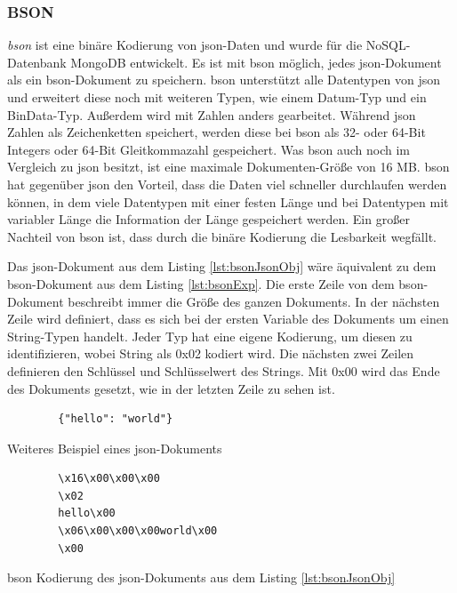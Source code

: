 \subsubsection{BSON}
\textit{\ac{bson}} ist eine binäre Kodierung von \ac{json}-Daten und wurde für die NoSQL-Datenbank MongoDB entwickelt.\cite{geeksforgeeksWhatBSON} Es ist mit \ac{bson} möglich, jedes \ac{json}-Dokument als ein \ac{bson}-Dokument zu speichern. \ac{bson} unterstützt alle Datentypen von \ac{json} und erweitert diese noch mit weiteren Typen, wie einem Datum-Typ und ein BinData-Typ. Außerdem wird mit Zahlen anders gearbeitet. Während \ac{json} Zahlen als Zeichenketten speichert, werden diese bei \ac{bson} als 32- oder 64-Bit Integers oder 64-Bit Gleitkommazahl gespeichert. Was \ac{bson} auch noch im Vergleich zu \ac{json} besitzt, ist eine maximale Dokumenten-Größe von 16 MB. \ac{bson} hat gegenüber \ac{json} den Vorteil, dass die Daten viel schneller durchlaufen werden können, in dem viele Datentypen mit einer festen Länge und bei Datentypen mit variabler Länge die Information der Länge gespeichert werden. Ein großer Nachteil von \ac{bson} ist, dass durch die binäre Kodierung die Lesbarkeit wegfällt.\cite{bsonspecBSONBinary}\cite{postgreSQLandBSON}\cite{mongodbJSONBSON}

Das \ac{json}-Dokument aus dem Listing \ref{lst:bsonJsonObj} wäre äquivalent zu dem \ac{bson}-Dokument aus dem Listing \ref{lst:bsonExp}. Die erste Zeile von dem \ac{bson}-Dokument beschreibt immer die Größe des ganzen Dokuments. In der nächsten Zeile wird definiert, dass es sich bei der ersten Variable des Dokuments um einen String-Typen handelt. Jeder Typ hat eine eigene Kodierung, um diesen zu identifizieren, wobei String als 0x02 kodiert wird. Die nächsten zwei Zeilen definieren den Schlüssel und Schlüsselwert des Strings. Mit 0x00 wird das Ende des Dokuments gesetzt, wie in der letzten Zeile zu sehen ist.

\begin{listing}[htp]
    \begin{verbatim}
        {"hello": "world"}
    \end{verbatim}
    \caption{Weiteres Beispiel eines \ac{json}-Dokuments \cite{mongodbJSONBSON}}
    \label{lst:bsonJsonObj}
\end{listing} 

\begin{listing}[htp]
    \begin{verbatim} 
        \x16\x00\x00\x00           
        \x02                      
        hello\x00                  
        \x06\x00\x00\x00world\x00  
        \x00                       
    \end{verbatim}
    \caption{\ac{bson} Kodierung des \ac{json}-Dokuments aus dem Listing \ref{lst:bsonJsonObj} \cite{mongodbJSONBSON}}
    \label{lst:bsonExp}
\end{listing}

